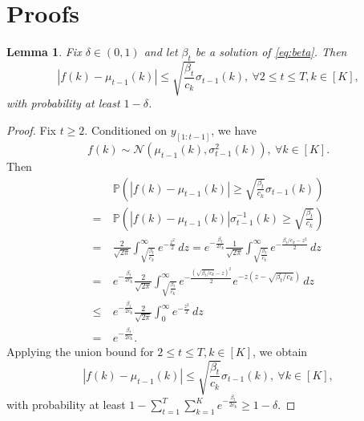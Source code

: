 \documentclass[letterpaper]{vldb}
\newtheorem{lemma}[theorem]{Lemma}
\newcommand{\cN}{\mathcal{N}}
\newcommand{\bP}{\mathbb{P}} %
\begin{document}
\section{Proofs}
\begin{lemma}
  \label{lem:5.1}
  Fix $\delta \in (0,1)$ and let $\beta_t $ be a solution of \eqref{eq:beta}. Then
  \[
    |f(k) - \mu_{t-1}(k) | \le \sqrt{\frac{\beta_t}{c_k}}\sigma_{t-1}(k),\
    \forall 2\le t\le T, k\in [K],
  \]
  with probability at least $1-\delta$.
\end{lemma}

\begin{proof}
  Fix $t\ge 2$. Conditioned on $y_{[1:t-1]}$, we have
  \[
    f(k) \sim \cN(\mu_{t-1}(k), \sigma^2_{t-1}(k)), \ \forall k\in [K].
  \]
  Then
  \begin{align*}
    & \bP\left(|f(k)- \mu_{t-1}(k)| \ge \sqrt{\frac{\beta_t}{c_k}}\sigma_{t-1}(k)\right)\\
    =\ & \bP\left(|f(k)- \mu_{t-1}(k)|\sigma^{-1}_{t-1}(k) \ge \sqrt{\frac{\beta_t}{c_k}}\right)\\
    =\ & \frac{2}{\sqrt{2\pi}}\int_{\sqrt{\frac{\beta_t}{c_k}}}^\infty e^{-\frac{z^2}{2}}\, dz = e^{-\frac{\beta_t}{2c_k}} \frac{1}{\sqrt{2\pi}}\int_{\sqrt{\frac{\beta_t}{c_k}}}^\infty e^{-\frac{\beta_t/c_k-z^2}{2}}\, dz\\
    =\ & e^{-\frac{\beta_t}{2c_k}} \frac{2}{\sqrt{2\pi}}\int_{\sqrt{\frac{\beta_t}{c_k}}}^\infty e^{-\frac{(\sqrt{\beta_t/c_k}-z)^2}{2}}e^{-z(z-\sqrt{\beta_t/c_k})}\, dz\\
    \le \ & e^{-\frac{\beta_t}{2c_k}} \frac{2}{\sqrt{2\pi}} \int_0^\infty e^{-\frac{z^2}{2}}\, dz\\
    =\ & e^{-\frac{\beta_t}{2c_k}}.
  \end{align*}
  Applying the union bound for $2\le t\le T, k\in [K]$, we obtain
  \[
    |f(k) - \mu_{t-1}(k) | \le \sqrt{\frac{\beta_t}{c_k}}\sigma_{t-1}(k),\
    \forall k\in [K],
  \]
  with probability at least $1- \sum_{t=1}^T\sum_{k=1}^K
  e^{-\frac{\beta_t}{2c_k}} \ge  1 - \delta$.
\end{proof}
\end{document}
